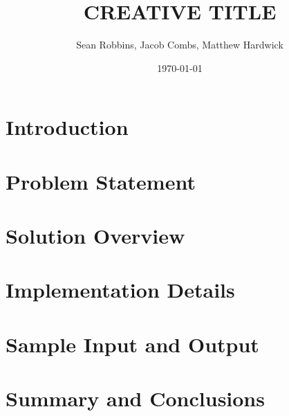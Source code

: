 \documentclass[12pt]{article} %
\title{CREATIVE TITLE}
\author{Sean Robbins, Jacob Combs, Matthew Hardwick}
\date{\today}
\begin{document}
\maketitle
\tableofcontents

\section{Introduction}


\section{Problem Statement}


\section{Solution Overview}


\section{Implementation Details}


\section{Sample Input and Output}


\section{Summary and Conclusions}




\end{document}
